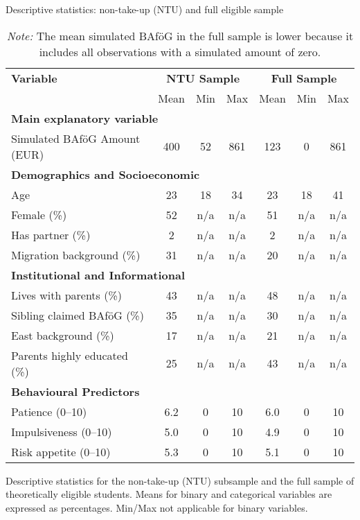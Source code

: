 \begin{table}[H]
\footnotesize
\caption*{Descriptive statistics: non-take-up (NTU) and full eligible sample}
\centering
\begin{tabular}{p{8cm}ccc|ccc}
\toprule
\textbf{Variable} & \multicolumn{3}{c|}{\textbf{NTU Sample}} & \multicolumn{3}{c}{\textbf{Full Sample}} \\
& Mean & Min & Max & Mean & Min & Max \\
\midrule
\multicolumn{7}{l}{\textbf{Main explanatory variable}} \\
Simulated BAföG Amount (EUR)       & 400    & 52    & 861   & 123    & 0    & 861   \\
\midrule
\multicolumn{6}{l}{\textbf{Demographics and Socioeconomic}} \\
Age                         & 23     & 18    & 34    & 23     & 18   & 41    \\
Female (\%)                 & 52     & n/a   & n/a   & 51     & n/a  & n/a   \\
Has partner (\%)            & 2      & n/a   & n/a   & 2      & n/a  & n/a   \\
Migration background (\%)   & 31     & n/a   & n/a   & 20     & n/a  & n/a   \\
\midrule
\multicolumn{6}{l}{\textbf{Institutional and Informational}} \\
Lives with parents (\%)          & 43     & n/a   & n/a   & 48     & n/a  & n/a   \\
Sibling claimed BAföG (\%)  & 35     & n/a   & n/a   & 30     & n/a  & n/a   \\
East background (\%)        & 17     & n/a   & n/a   & 21     & n/a  & n/a   \\
Parents highly educated (\%)& 25     & n/a   & n/a   & 43     & n/a  & n/a   \\
\midrule
\multicolumn{6}{l}{\textbf{Behavioural Predictors}} \\
Patience (0--10)            & 6.2    & 0     & 10    & 6.0    & 0    & 10    \\
Impulsiveness (0--10)       & 5.0    & 0     & 10    & 4.9    & 0    & 10    \\
Risk appetite (0--10)       & 5.3    & 0     & 10    & 5.1    & 0    & 10    \\
\bottomrule
\end{tabular}
\caption{\small{Descriptive statistics for the non-take-up (NTU) subsample and the full sample of theoretically eligible students. Means for binary and categorical variables are expressed as percentages. Min/Max not applicable for binary variables.}}
\caption*{\small{\textit{Note:}  The mean simulated BAföG in the full sample is lower because it includes all observations with a simulated amount of zero.}}
\label{tab:descriptive_ntu_all}
\end{table}

